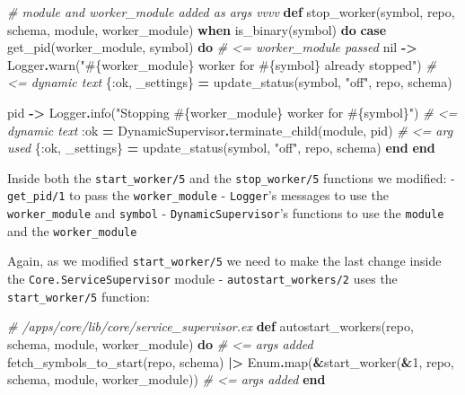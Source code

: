 \documentclass[
  oneside]{book}
\newenvironment{Shaded}{\begin{snugshade}}{\end{snugshade}}
\newcommand{\CommentTok}[1]{\textcolor[rgb]{0.56,0.35,0.01}{\textit{#1}}}
\newcommand{\ConstantTok}[1]{\textcolor[rgb]{0.00,0.00,0.00}{#1}}
\newcommand{\DecValTok}[1]{\textcolor[rgb]{0.00,0.00,0.81}{#1}}
\newcommand{\KeywordTok}[1]{\textcolor[rgb]{0.13,0.29,0.53}{\textbf{#1}}}
\newcommand{\NormalTok}[1]{#1}
\newcommand{\OperatorTok}[1]{\textcolor[rgb]{0.81,0.36,0.00}{\textbf{#1}}}
\newcommand{\OtherTok}[1]{\textcolor[rgb]{0.56,0.35,0.01}{#1}}
\newcommand{\StringTok}[1]{\textcolor[rgb]{0.31,0.60,0.02}{#1}}
\newcommand{\VariableTok}[1]{\textcolor[rgb]{0.00,0.00,0.00}{#1}}
\begin{document}
\begin{Shaded}
\begin{Highlighting}[]
  \CommentTok{\# module and worker\_module added as args vvvv}
  \KeywordTok{def}\NormalTok{ stop\_worker(symbol, repo, schema, module, worker\_module)}
      \KeywordTok{when}\NormalTok{ is\_binary(symbol) }\KeywordTok{do}
    \KeywordTok{case}\NormalTok{ get\_pid(worker\_module, symbol) }\KeywordTok{do} \CommentTok{\# \textless{}= worker\_module passed}
      \ConstantTok{nil} \OperatorTok{{-}\textgreater{}}
        \ConstantTok{Logger}\OperatorTok{.}\NormalTok{warn(}\StringTok{"}\OtherTok{\#\{}\NormalTok{worker\_module}\OtherTok{\}}\StringTok{ worker for }\OtherTok{\#\{}\NormalTok{symbol}\OtherTok{\}}\StringTok{ already stopped"}\NormalTok{) }\CommentTok{\# \textless{}= dynamic text}
\NormalTok{        \{}\VariableTok{:ok}\NormalTok{, \_settings\} }\OperatorTok{=}\NormalTok{ update\_status(symbol, }\StringTok{"off"}\NormalTok{, repo, schema)}

\NormalTok{      pid }\OperatorTok{{-}\textgreater{}}
        \ConstantTok{Logger}\OperatorTok{.}\NormalTok{info(}\StringTok{"Stopping }\OtherTok{\#\{}\NormalTok{worker\_module}\OtherTok{\}}\StringTok{ worker for }\OtherTok{\#\{}\NormalTok{symbol}\OtherTok{\}}\StringTok{"}\NormalTok{) }\CommentTok{\# \textless{}= dynamic text}
        \VariableTok{:ok} \OperatorTok{=} \ConstantTok{DynamicSupervisor}\OperatorTok{.}\NormalTok{terminate\_child(module, pid) }\CommentTok{\# \textless{}= arg used}
\NormalTok{        \{}\VariableTok{:ok}\NormalTok{, \_settings\} }\OperatorTok{=}\NormalTok{ update\_status(symbol, }\StringTok{"off"}\NormalTok{, repo, schema)}
    \KeywordTok{end}
  \KeywordTok{end}
\end{Highlighting}
\end{Shaded}

Inside both the \texttt{start\_worker/5} and the \texttt{stop\_worker/5} functions we modified:
- \texttt{get\_pid/1} to pass the \texttt{worker\_module}
- \texttt{Logger}'s messages to use the \texttt{worker\_module} and \texttt{symbol}
- \texttt{DynamicSupervisor}'s functions to use the \texttt{module} and the \texttt{worker\_module}

Again, as we modified \texttt{start\_worker/5} we need to make the last change inside the \texttt{Core.ServiceSupervisor} module - \texttt{autostart\_workers/2} uses the \texttt{start\_worker/5} function:

\begin{Shaded}
\begin{Highlighting}[]
  \CommentTok{\# /apps/core/lib/core/service\_supervisor.ex}
  \KeywordTok{def}\NormalTok{ autostart\_workers(repo, schema, module, worker\_module) }\KeywordTok{do} \CommentTok{\# \textless{}= args added}
\NormalTok{    fetch\_symbols\_to\_start(repo, schema)}
    \OperatorTok{|\textgreater{}} \ConstantTok{Enum}\OperatorTok{.}\NormalTok{map(}\OperatorTok{\&}\NormalTok{start\_worker(}\OperatorTok{\&}\DecValTok{1}\NormalTok{, repo, schema, module, worker\_module)) }\CommentTok{\# \textless{}= args added}
  \KeywordTok{end}
\end{Highlighting}
\end{Shaded}
\end{document}

